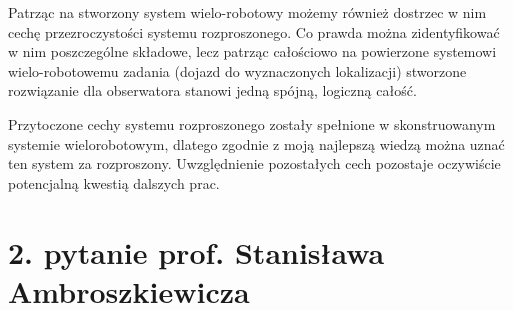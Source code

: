 \begin{frame}
{Patrząc na stworzony system wielo-robotowy możemy również dostrzec w nim cechę  przezroczystości systemu rozproszonego. Co prawda można zidentyfikować w nim poszczególne składowe, lecz patrząc całościowo na powierzone systemowi wielo-robotowemu zadania (dojazd do wyznaczonych lokalizacji) stworzone rozwiązanie dla obserwatora stanowi jedną spójną,  logiczną całość. 

Przytoczone cechy systemu rozproszonego zostały spełnione w skonstruowanym systemie wielorobotowym, dlatego zgodnie z moją najlepszą wiedzą można uznać ten system za rozproszony. Uwzględnienie pozostałych cech pozostaje oczywiście potencjalną kwestią dalszych prac.
}
\end{frame}

\section*{2. pytanie prof. Stanisława Ambroszkiewicza}
